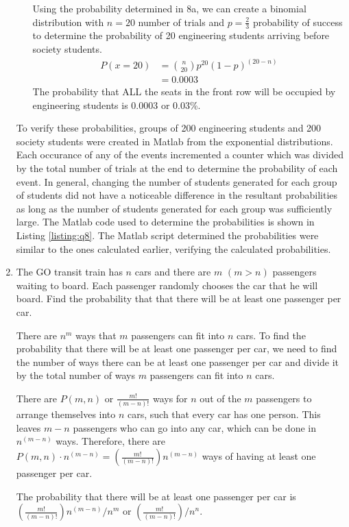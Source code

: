 \documentclass[12pt]{article}
\begin{document}
\begin{enumerate}
\begin{enumerate}
        Using the probability determined in 8a, we can create a binomial distribution with $n = 20$ number of trials and $p = \frac{2}{3}$ probability of success to determine the probability of 20 engineering students arriving before society students.
        \begin{equation*}
            \begin{aligned}
                P(x = 20) &= \binom{n}{20} p^20 (1-p)^{(20-n)} \\
                &= 0.0003
            \end{aligned}
        \end{equation*}
        The probability that ALL the seats in the front row will be occupied by engineering students is 0.0003 or 0.03\%.
    \end{enumerate}
    To verify these probabilities, groups of 200 engineering students and 200 society students were created in Matlab from the exponential distributions. Each occurance of any of the events incremented a counter which was divided by the total number of trials at the end to determine the probability of each event. In general, changing the number of students generated for each group of students did not have a noticeable difference in the resultant probabilities as long as the number of students generated for each group was sufficiently large. The Matlab code used to determine the probabilities is shown in Listing \ref{listing:q8}. The Matlab script determined the probabilities were similar to the ones calculated earlier, verifying the calculated probabilities.   
    

    \item The GO transit train has $n$ cars and there are $m$ $(m>n)$ passengers waiting to board. Each passenger randomly chooses the car that he will board. Find the probability that that there will be at least one passenger per car.

    There are $n^m$ ways that $m$ passengers can fit into $n$ cars. To find the probability that there will be at least one passenger per car, we need to find the number of ways there can be at least one passenger per car and divide it by the total number of ways $m$ passengers can fit into $n$ cars. 
    
    There are $P(m,n)$ or $\frac{m!}{(m-n)!}$ ways for $n$ out of the $m$ passengers to arrange themselves into $n$ cars, such that every car has one person. This leaves $m-n$ passengers who can go into any car, which can be done in $n^{(m-n)}$ ways. Therefore, there are $P(m,n) \cdot n^{(m-n)} = (\frac{m!}{(m-n)!})n^{(m-n)}$ ways of having at least one passenger per car.

    The probability that there will be at least one passenger per car is $(\frac{m!}{(m-n)!})n^{(m-n)} / n^m$ or $(\frac{m!}{(m-n)!}) / n^n$.
\end{enumerate}
\end{document}
